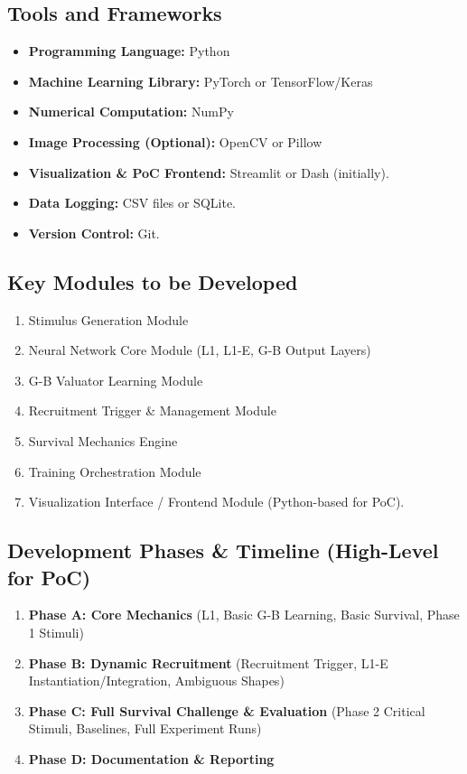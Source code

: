 \documentclass{article}
\begin{document}
\subsection{Tools and Frameworks}
\begin{itemize}
    \item \textbf{Programming Language:} Python
    \item \textbf{Machine Learning Library:} PyTorch or TensorFlow/Keras
    \item \textbf{Numerical Computation:} NumPy
    \item \textbf{Image Processing (Optional):} OpenCV or Pillow
    \item \textbf{Visualization \& PoC Frontend:} Streamlit or Dash (initially).
    \item \textbf{Data Logging:} CSV files or SQLite.
    \item \textbf{Version Control:} Git.
\end{itemize}

\subsection{Key Modules to be Developed}
\begin{enumerate}
    \item Stimulus Generation Module
    \item Neural Network Core Module (L1, L1-E, G-B Output Layers)
    \item G-B Valuator Learning Module
    \item Recruitment Trigger \& Management Module
    \item Survival Mechanics Engine
    \item Training Orchestration Module
    \item Visualization Interface / Frontend Module (Python-based for PoC).
\end{enumerate}

\subsection{Development Phases \& Timeline (High-Level for PoC)}
\begin{enumerate}
    \item \textbf{Phase A: Core Mechanics} (L1, Basic G-B Learning, Basic Survival, Phase 1 Stimuli)
    \item \textbf{Phase B: Dynamic Recruitment} (Recruitment Trigger, L1-E Instantiation/Integration, Ambiguous Shapes)
    \item \textbf{Phase C: Full Survival Challenge \& Evaluation} (Phase 2 Critical Stimuli, Baselines, Full Experiment Runs)
    \item \textbf{Phase D: Documentation \& Reporting}
\end{enumerate}
\end{document}
